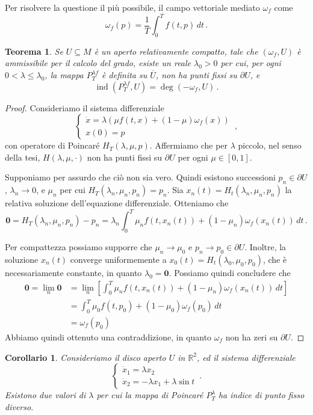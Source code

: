 \documentclass[a4paper, 11pt]{article}
\theoremstyle{definition}
\theoremstyle{plain}
\newtheorem{Teo}[Def]{Teorema}
\newtheorem{Cor}[Def]{Corollario}
\newcommand{\zero}{\mathbf{0}}
\newcommand{\R}{\mathbb{R}}
\newcommand{\cl}[1]{\overline{#1}}
\DeclareMathOperator{\ind}{ind}
\begin{document}
Per risolvere la questione il più possibile, il campo vettoriale mediato $\omega_f$ come
\[
	\omega_f(p) = \frac{1}{T}\int_0^T f(t,p)\,dt\,.
\]
\begin{Teo}
	Se $U \subseteq M$ è un aperto relativamente compatto, tale che $(\omega_f,U)$ è ammissibile per il calcolo del grado, esiste un reale $\lambda_0 > 0$ per cui, per ogni $0 < \lambda \le \lambda_0$, la mappa $P_T^{\lambda f}$ è definita su $\cl{U}$, non ha punti fissi su $\partial U$, e 
	\[
		\ind(P_T^{\lambda f}, U) = \deg(-\omega_f, U)\,.
	\]
\end{Teo}
\begin{proof}
	Consideriamo il sistema differenziale
	\[
		\begin{cases}
			\dot{x} = \lambda(\mu f(t,x) + (1-\mu) \omega_f(x))\\
			x(0) = p
		\end{cases}\,,
	\]
	con operatore di Poincaré $H_T(\lambda, \mu,p)$. Affermiamo che per $\lambda$ piccolo, nel senso della tesi, $H(\lambda, \mu, \cdot )$ non ha punti fissi su $\partial U$ per ogni $\mu \in [0,1]$.
	
	Supponiamo per assurdo che ciò non sia vero. Quindi esistono successioni $p_n \in \partial U$, $\lambda_n \to 0$, e $\mu_n$ per cui $H_T(\lambda_n, \mu_n, p_n) = p_n$. Sia $x_n(t) = H_t(\lambda_n,\mu_n,p_n)$ la relativa soluzione dell'equazione differenziale. Otteniamo che 
	\[
		\zero = H_T(\lambda_n, \mu_n, p_n) - p_n =  \lambda_n\int_0^T\mu_n f(t,x_n(t)) + (1-\mu_n) \omega_f(x_n(t))\,dt\,.
	\]
	
	Per compattezza possiamo supporre che $\mu_n \to \mu_0$ e $p_n \to p_0 \in \partial U$. Inoltre, la soluzione $x_n(t)$ converge uniformemente a $x_0(t) = H_t(\lambda_0,\mu_0,p_0)$, che è necessariamente constante, in quanto $\lambda_0 = \zero$. Possiamo quindi concludere che
	\[
		\begin{split}
			\zero = \lim_n\zero &= \lim_n\left[\int_0^T\mu_n f(t,x_n(t)) + (1-\mu_n) \omega_f(x_n(t))\,dt\right] \\
			&= \int_0^T\mu_0 f(t,p_0) + (1-\mu_0) \omega_f(p_0)\,dt\\
			&= \omega_f(p_0)
		\end{split}
	\]
	Abbiamo quindi ottenuto una contraddizione, in quanto $\omega_f$ non ha zeri su $\partial U$.
\end{proof}
\begin{Cor}
	Consideriamo il disco aperto $U$ in $\R^2$, ed il sistema differenziale
	\[
		\begin{cases}
			\dot{x}_1 = \lambda x_2 \\
			\dot{x}_2 = -\lambda x_1 + \lambda \sin t
		\end{cases}\,.
	\]
	Esistono due valori di $\lambda$ per cui la mappa di Poincaré $P^\lambda_T$ ha indice di punto fisso diverso.
\end{Cor}
\end{document}
